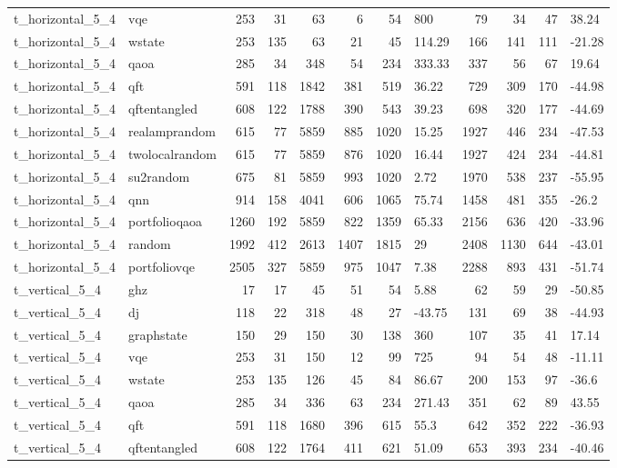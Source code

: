 \begin{longtable}{llrrrrrlrrrl}
t\_horizontal\_5\_4 & vqe & 253 & 31 & 63 & 6 & 54 & 800 & 79 & 34 & 47 & 38.24 \\
t\_horizontal\_5\_4 & wstate & 253 & 135 & 63 & 21 & 45 & 114.29 & 166 & 141 & 111 & -21.28 \\
t\_horizontal\_5\_4 & qaoa & 285 & 34 & 348 & 54 & 234 & 333.33 & 337 & 56 & 67 & 19.64 \\
t\_horizontal\_5\_4 & qft & 591 & 118 & 1842 & 381 & 519 & 36.22 & 729 & 309 & 170 & -44.98 \\
t\_horizontal\_5\_4 & qftentangled & 608 & 122 & 1788 & 390 & 543 & 39.23 & 698 & 320 & 177 & -44.69 \\
t\_horizontal\_5\_4 & realamprandom & 615 & 77 & 5859 & 885 & 1020 & 15.25 & 1927 & 446 & 234 & -47.53 \\
t\_horizontal\_5\_4 & twolocalrandom & 615 & 77 & 5859 & 876 & 1020 & 16.44 & 1927 & 424 & 234 & -44.81 \\
t\_horizontal\_5\_4 & su2random & 675 & 81 & 5859 & 993 & 1020 & 2.72 & 1970 & 538 & 237 & -55.95 \\
t\_horizontal\_5\_4 & qnn & 914 & 158 & 4041 & 606 & 1065 & 75.74 & 1458 & 481 & 355 & -26.2 \\
t\_horizontal\_5\_4 & portfolioqaoa & 1260 & 192 & 5859 & 822 & 1359 & 65.33 & 2156 & 636 & 420 & -33.96 \\
t\_horizontal\_5\_4 & random & 1992 & 412 & 2613 & 1407 & 1815 & 29 & 2408 & 1130 & 644 & -43.01 \\
t\_horizontal\_5\_4 & portfoliovqe & 2505 & 327 & 5859 & 975 & 1047 & 7.38 & 2288 & 893 & 431 & -51.74 \\
t\_vertical\_5\_4 & ghz & 17 & 17 & 45 & 51 & 54 & 5.88 & 62 & 59 & 29 & -50.85 \\
t\_vertical\_5\_4 & dj & 118 & 22 & 318 & 48 & 27 & -43.75 & 131 & 69 & 38 & -44.93 \\
t\_vertical\_5\_4 & graphstate & 150 & 29 & 150 & 30 & 138 & 360 & 107 & 35 & 41 & 17.14 \\
t\_vertical\_5\_4 & vqe & 253 & 31 & 150 & 12 & 99 & 725 & 94 & 54 & 48 & -11.11 \\
t\_vertical\_5\_4 & wstate & 253 & 135 & 126 & 45 & 84 & 86.67 & 200 & 153 & 97 & -36.6 \\
t\_vertical\_5\_4 & qaoa & 285 & 34 & 336 & 63 & 234 & 271.43 & 351 & 62 & 89 & 43.55 \\
t\_vertical\_5\_4 & qft & 591 & 118 & 1680 & 396 & 615 & 55.3 & 642 & 352 & 222 & -36.93 \\
t\_vertical\_5\_4 & qftentangled & 608 & 122 & 1764 & 411 & 621 & 51.09 & 653 & 393 & 234 & -40.46 \\

\end{longtable}

